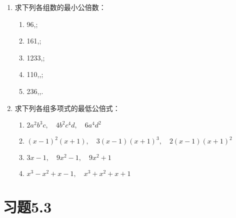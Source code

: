 \begin{ex}
\begin{enumerate}
    \item 求下列各组数的最小公倍数：
    \begin{multicols}{2}
        \begin{enumerate}
        \item 96,;
        \item 161,;
        \item 1233,;
        \item 110,,;
        \item 236,,.
    \end{enumerate}
    \end{multicols}
    
    \item 求下列各组多项式的最低公倍式：
    \begin{enumerate}
        \item $2a^2b^3c,\quad 4b^2c^4d,\quad 6a^4d^2$
        \item $(x-1)^2(x+1),\quad 3(x-1)(x+1)^3,\quad 2 (x-1) (x+1)^2$
        \item $3x-1,\quad 9x^2-1,\quad 9x^2+1$
        \item $x^3-x^2+x-1,\quad x^3+x^2+x+1$
    \end{enumerate}
\end{enumerate}
\end{ex}

\section*{习题5.3}

